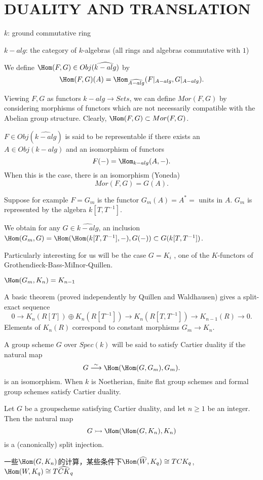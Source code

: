 \section{DUALITY  AND  TRANSLATION}
$k$: ground commutative ring

$k-alg$: the category of $k$-algebras (all rings and algebras commutative with $1$)

\begin{definition}
	We define  $\Hom(F,  G)  \in Obj(\widehat{k-alg})$ by
	\[\Hom(F,  G)(A)  =  \Hom_{\widehat{A-alg}}(F |_{A-alg},  G |_{A-alg}).\]
\end{definition}
Viewing  $F, G$ as functors $ k-alg \longrightarrow Sets$,  we can define  $Mor(F,  G)$ by considering  morphisms  of functors  which  are not necessarily  compatible  with  the Abelian  group  structure.  Clearly,  $\Hom(F,  G) \subset Mor(F,  G)$.
\begin{definition}
	$F \in Obj(\widehat{k-alg})$ is said to be representable  if there  exists  an $A  \in Obj(k-alg)$ and an
	isomorphism  of functors
	\[F(-) = \Hom_{k-alg}(A, -).\]
	When  this is the case, there is an isomorphism  (Yoneda)
	\[Mor(F,  G) =  G(A).\]
\end{definition}
Suppose  for example  $F =  G_m$ is the functor
$G_m(A)  = A^*  =$  units in $A$. $G_m$ is represented  by the algebra $k[T, T^{-1}]$.  

We obtain for any $G \in \widehat{k-alg}$, an inclusion  $\Hom(G_m, G)=\Hom(\Hom(k[T, T^{-1}],-),G(-)) \subset G(k[T, T^{-1}])$.  

Particularly  interesting  for  us will be the  case $G =  K_i$ , one  of the  $K$-functors  of Grothendieck-Bass-MiInor-Quillen.
\begin{theorem}
	$\Hom(G_m, K_n)  = K_{n-1}$
\end{theorem}
A  basic  theorem  (proved independently  by Quillen  and Waldhausen)  gives a split-exact  sequence
\[0 \longrightarrow  K_n(R[T])  \oplus K_n(R[T^{-1}])  \longrightarrow K_n(R[T, T^{-1}]) \longrightarrow K_{n-1}(R)  \longrightarrow 0.\]
Elements  of  $K_n(R)$ correspond  to constant  morphisms  $G_m\longrightarrow K_n$. 

A group  scheme  $G$ over $Spec(k)$ will  be said to satisfy  Cartier  duality  if the
natural  map
\[G \overset{\sim}\longrightarrow  \Hom(\Hom(G, G_m), G_m).\]
is an isomorphism.  
When  $k$ is Noetherian,  finite  flat group  schemes  and formal
group  schemes satisfy Cartier  duality.

\begin{theorem}
	Let  $G$ be a groupscheme  satisfying  Cartier  duality,  and  let
	$n \geq  1$ be an integer.  Then the  natural  map
	\[G \rightarrowtail  \Hom(\Hom(G,  K_n), K_n)\]
	is a (canonically)  split injection.
\end{theorem}
{\color{red}一些$\Hom(G,K_n)$的计算，某些条件下$\Hom(\widehat{W},K_q)\cong TCK_q$, $\Hom(W,K_q)\cong T\widehat{CK}_q$}

